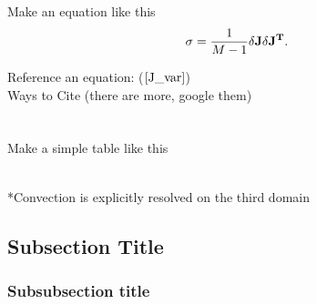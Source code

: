 \documentclass{ttuthes2015}
\newcommand{\addTOCspace}[1][2ex]{\addtocontents{toc}{\protect\addvspace{#1}}}
\newcommand{\tab}{\hspace*{2em}}  %
\begin{document}
\tab Make an equation like this
\begin{align}\label{J_var}
	\sigma = \frac{1}{M-1} \delta\bf{J} \delta{\mathbf{J}}^T.
\end{align}

\tab Reference an equation: ($\ref{J_var}$) \\
\tab Ways to Cite (there are more, google them) \\
\citep{Ancell2013} \\
\cite{Ancell2013} \\

\tab Make a simple table like this
\begin{table}[!h]   %
\caption{Model Parameterizations Used} 
\centering %
 \\
*Convection is explicitly resolved on the third domain
\label{params} %
\end{table} 


\subsection{Subsection Title} %
\addTOCspace

\subsubsection{Subsubsection title}
\addTOCspace

\backmatter
\end{document}
